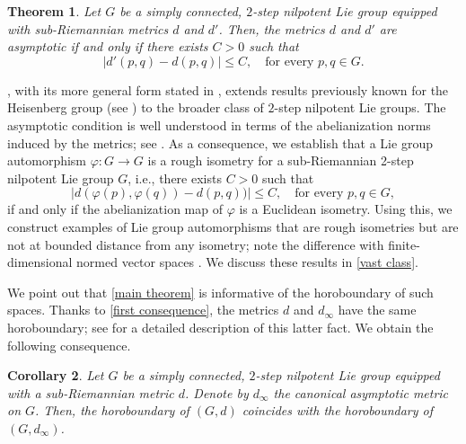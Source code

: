 \documentclass[a4paper,11pt,reqno]{amsart}
\theoremstyle{plain}
\newtheorem{theorem}{Theorem}[section]
\newtheorem{corollary}[theorem]{Corollary}
\theoremstyle{definition}
\newcommand{\vphi}{\varphi}
\begin{document}
\begin{theorem} \label{equivalence quasi_isometries intro}
Let $G$ be a simply connected, $2$-step nilpotent Lie group equipped with sub-Riemannian metrics $d$ and $d'$. Then, the metrics $d$ and $d'$ are asymptotic if and only if there exists $C > 0$ such that
\begin{equation*}
\lvert d'(p,q) - d(p,q) \rvert \leq C, \quad \text{for every } p,q \in G.
\end{equation*}
\end{theorem}

, with its more general form stated in , extends results previously known for the Heisenberg group (see \cite[Theorem 1.2]{MR3673666}) to the broader class of $2$-step nilpotent Lie groups. The asymptotic condition is well understood in terms of the abelianization norms induced by the metrics; see \cite[Proposition~3]{MR3153949}. As a consequence, we establish that a Lie group automorphism 
$\vphi:G\to G$
is a rough isometry for a sub-Riemannian 2-step nilpotent Lie group $G$, i.e.,
 there exists $C>0$ such that $$\lvert d(\vphi(p),\vphi(q)) - d(p,q)) \rvert \le C, \quad \text{for every $p,q \in G$},$$
if and only if the abelianization map of $\vphi$ is a Euclidean isometry. 
Using this, we construct examples of Lie group automorphisms that are rough isometries but are not at bounded distance from any isometry; note the difference with finite-dimensional normed vector spaces \cite[Theorem~3]{MR511409}. We discuss these results in \cref{vast class}.


We point out that \cref{main theorem} is informative of the horoboundary of such spaces. Thanks to \eqref{first consequence}, the metrics $d$ and $d_\infty$ have the same horoboundary; see \cite[Section 5]{MR3673666} for a detailed description of this latter fact. We obtain the following consequence.

\begin{corollary}\label{equivalence of horoboundary}
Let $G$ be a simply connected, $2$-step nilpotent Lie group equipped with a sub-Riemannian metric $d$.
Denote by $d_\infty$ the canonical asymptotic metric on $G$.
Then, the horoboundary of $(G,d)$ coincides with the horoboundary of $(G,d_\infty)$.
\end{corollary}
\end{document}
